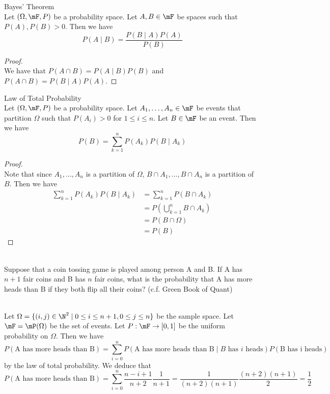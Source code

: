 \documentclass[a4paper]{article}
\begin{document}
\begin{thm}{Bayes' Theorem}{}\\
Let $(\Omega,\mF,P)$ be a probability space. Let $A,B\in\mF$ be spaces such that $P(A),P(B)>0$. Then we have $$P(A\;|\;B)=\frac{P(B\;|\;A)P(A)}{P(B)}$$
\begin{proof}\\
We have that $P(A\cap B)=P(A\;|\;B)P(B)$ and $P(A\cap B)=P(B\;|\;A)P(A)$. 
\end{proof}
\end{thm}

\begin{thm}{Law of Total Probability}{}\\
Let $(\Omega,\mF,P)$ be a probability space. Let $A_1,\dots,A_n\in\mF$ be events that partition $\Omega$ such that $P(A_i)>0$ for $1\leq i\leq n$. Let $B\in\mF$ be an event. Then we have $$P(B)=\sum_{k=1}^nP(A_k)P(B\;|\;A_k)$$
\begin{proof}\\
Note that since $A_1,\dots,A_n$ is a partition of $\Omega$, $B\cap A_1,\dots,B\cap A_n$ is a partition of $B$. Then we have
\begin{align*}
\sum_{k=1}^nP(A_k)P(B\;|\;A_k)&=\sum_{k=1}^nP(B\cap A_k)\\
&=P\left(\bigcup_{k=1}^nB\cap A_k\right)\\
&=P(B\cap\Omega)\\
&=P(B)
\end{align*}
\end{proof}
\end{thm}

\begin{eg}{}{}\\
Suppose that a coin tossing game is played among person A and B. If A has $n+1$ fair coins and B has $n$ fair coins, what is the probability that A has more heads than B if they both flip all their coins? (c.f. Green Book of Quant)
\begin{answer}\\
Let $\Omega=\{(i,j)\in\N^2\;|\;0\leq i\leq n+1,0\leq j\leq n\}$ be the sample space. Let $\mF=\mP(\Omega)$ be the set of events. Let $P:\mF\to[0,1]$ be the uniform probability on $\Omega$. Then we have $$P(\text{A has more heads than B})=\sum_{i=0}^nP(\text{A has more heads than B}\;|\;B\text{ has }i\text{ heads})P(\text{B has i heads})$$ by the law of total probability. We deduce that $$P(\text{A has more heads than B})=\sum_{i=0}^n\frac{n-i+1}{n+2}\frac{1}{n+1}=\frac{1}{(n+2)(n+1)}\frac{(n+2)(n+1)}{2}=\frac{1}{2}$$
\end{answer}
\end{eg}
\end{document}
